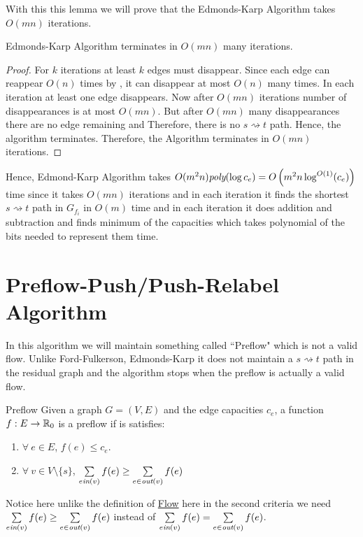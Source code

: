 With this this lemma we will prove that the Edmonds-Karp Algorithm takes $O(mn)$ iterations.
\begin{Theorem}{}{}
	Edmonds-Karp Algorithm terminates in $O(mn)$ many iterations.
\end{Theorem}
\begin{proof}
	For $k$ iterations at least $k$ edges must disappear. Since each edge can reappear $O(n)$ times by , it can disappear at most $O(n)$ many times. In each iteration at least one edge disappears. Now after $O(mn)$ iterations number of disappearances is at most $O(mn)$. But after $O(mn)$ many disappearances  there are no edge remaining and Therefore, there is no $s\rightsquigarrow t$ path. Hence, the algorithm terminates. Therefore, the Algorithm terminates in $O(mn)$ iterations.
\end{proof}

Hence, Edmond-Karp Algorithm takes $O(m^2n)\emph{poly}(\log c_e)=O\left(m^2n\log^{O(1)}(c_e)\right)$ time since it takes $O(mn)$ iterations and in each iteration it finds the shortest $s\rightsquigarrow t$ path in $G_{f_i}$ in $O(m)$ time and in each iteration it does addition and subtraction and finds minimum of the capacities which takes polynomial of the bits needed to represent them time.
\section{Preflow-Push/Push-Relabel Algorithm}
In this algorithm we will maintain something called ``Preflow" which is not a valid flow. Unlike Ford-Fulkerson, Edmonds-Karp it does not maintain a $s\rightsquigarrow t$ path in the residual graph and the algorithm stops when the preflow is actually a valid flow.
\begin{Definition}{Preflow}{}
	Given a graph $G=(V,E)$  and the edge capacities $c_e$, a function $f:E\to \mathbb{R}_0$ is a preflow if is satisfies:
	\begin{enumerate}[label=\protect\circled{\arabic*}]
		\item $\forall\ e\in E$, $f(e)\leq c_e$.
		\item $\forall \ v\in V\setminus\{s\}$, $\sum\limits_{e\emph{in}(v)}f(e)\geq \sum\limits_{e\in\emph{out}(v)}f(e)$
	\end{enumerate}
\end{Definition}
Notice here unlike the definition of \hyperref[def:flow]{Flow} here in the second criteria we need  $\sum\limits_{e\emph{in}(v)}f(e)\geq \sum\limits_{e\in\emph{out}(v)}f(e)$ instead of  $\sum\limits_{e\emph{in}(v)}f(e)= \sum\limits_{e\in\emph{out}(v)}f(e)$.

